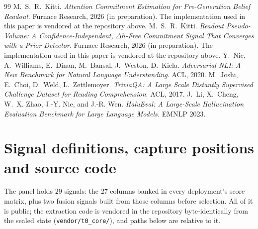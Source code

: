 \documentclass[11pt]{article}
\begin{document}
\begin{thebibliography}{99}
 M.~S.~R.~Kitti.
\emph{Attention Commitment Estimation for Pre-Generation Belief Readout}. Furnace Research, 2026
(in preparation). The implementation used in this paper is vendored at the repository above.
 M.~S.~R.~Kitti.
\emph{Readout Pseudo-Volume: A Confidence-Independent, $\Delta h$-Free Commitment Signal That
Converges with a Prior Detector}. Furnace Research, 2026 (in preparation). The implementation used
in this paper is vendored at the repository above.
 Y.~Nie, A.~Williams, E.~Dinan, M.~Bansal, J.~Weston, D.~Kiela.
\emph{Adversarial NLI: A New Benchmark for Natural Language Understanding}. ACL, 2020.
 M.~Joshi, E.~Choi, D.~Weld, L.~Zettlemoyer.
\emph{TriviaQA: A Large Scale Distantly Supervised Challenge Dataset for Reading Comprehension}.
ACL, 2017.
 J.~Li, X.~Cheng, W.~X. Zhao, J.-Y. Nie, and J.-R. Wen.
\emph{HaluEval: A Large-Scale Hallucination Evaluation Benchmark for Large Language Models.}
EMNLP 2023.
\end{thebibliography}
\endgroup

\appendix
\section{Signal definitions, capture positions and source code}
\label{app:signals}

The panel holds $29$ signals: the $27$ columns banked in every deployment's score matrix, plus two
fusion signals built from those columns before selection. All of it is public; the extraction code is
vendored in the repository byte-identically from the sealed state (\texttt{vendor/t0\_core/}), and
paths below are relative to it.
\end{document}
